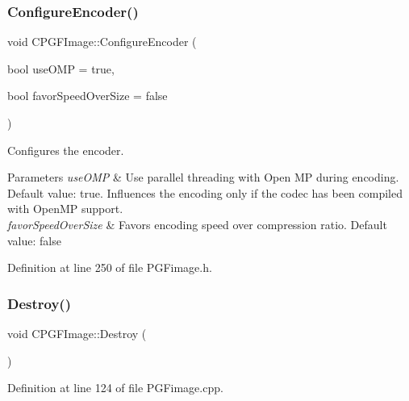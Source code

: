 \subsubsection{\texorpdfstring{ConfigureEncoder()}{ConfigureEncoder()}}
{\footnotesize\ttfamily void C\+P\+G\+F\+Image\+::\+Configure\+Encoder (\begin{DoxyParamCaption}\item[{bool}]{use\+O\+MP = {\ttfamily true},  }\item[{bool}]{favor\+Speed\+Over\+Size = {\ttfamily false} }\end{DoxyParamCaption})\hspace{0.3cm}{\ttfamily [inline]}}

Configures the encoder. 
\begin{DoxyParams}{Parameters}
{\em use\+O\+MP} & Use parallel threading with Open MP during encoding. Default value\+: true. Influences the encoding only if the codec has been compiled with Open\+MP support. \\
\hline
{\em favor\+Speed\+Over\+Size} & Favors encoding speed over compression ratio. Default value\+: false \\
\hline
\end{DoxyParams}


Definition at line 250 of file P\+G\+Fimage.\+h.


\begin{DoxyCode}{0}

\end{DoxyCode}
\mbox{\label{classCPGFImage_a4a3e55e2e2d8ddf79506769feb8938ec}} 
\subsubsection{\texorpdfstring{Destroy()}{Destroy()}}
{\footnotesize\ttfamily void C\+P\+G\+F\+Image\+::\+Destroy (\begin{DoxyParamCaption}{ }\end{DoxyParamCaption})}



Definition at line 124 of file P\+G\+Fimage.\+cpp.


